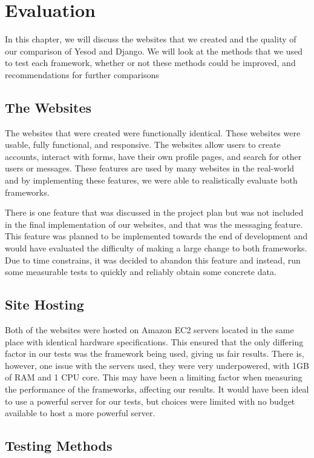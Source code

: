 \chapter{Evaluation}
\label{chap:Evaluation}
In this chapter, we will discuss the websites that we created and
the quality of our comparison
of Yesod and Django. We will look at the methods that we used
to test each framework, whether or not these methods could
be improved, and recommendations for further comparisons

\section{The Websites}

The websites that were created were functionally identical. These
websites were usable, fully functional, and responsive.
The websites allow users to create accounts, interact with forms,
have their own profile pages, and search for other users or
messages. These features are used by many websites
in the real-world and by implementing these features, we
were able to realistically evaluate both frameworks.

There is one feature that was discussed in the project plan
but was not included in the final implementation of our websites,
and that was the messaging feature. This feature was planned
to be implemented towards the end of development and would
have evaluated the difficulty of making a large change to both
frameworks. Due to time constrains, it was decided to abandon
this feature and instead, run some measurable tests to quickly
and reliably obtain some concrete data.

\section{Site Hosting}

Both of the websites were hosted on Amazon EC2 servers located
in the same place with identical hardware specifications. This
ensured that the only differing factor in our tests was the
framework being used, giving us fair results. There is, however,
one issue with the servers used, they were very underpowered,
with 1GB of RAM and 1 CPU core. This may have been a limiting
factor when measuring the performance of the frameworks, affecting
our results. It would have been ideal to use a powerful server
for our tests, but choices were limited with no budget available
to host a more powerful server.

\section{Testing Methods}

